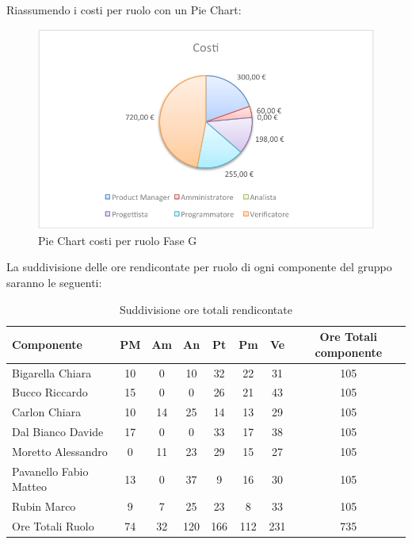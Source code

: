 				Riassumendo i costi per ruolo con un Pie Chart:
				\begin{figure}[H]\centering
					\includegraphics[width=\textwidth]{PianoDiProgetto/Pics/ChartTotCostiFaseG.pdf}
					\caption{Pie Chart costi per ruolo Fase G}
				\end{figure}
			La suddivisione delle ore rendicontate per ruolo di ogni componente del gruppo \groupname{} saranno le seguenti:
			\begin{table}[H]
				\begin{center}
					\begin{tabular}{| l | c | c | c | c | c | c | c |}
						\hline
						Componente 				& PM	& Am 	& An 	& Pt 		& Pm 	& Ve 	& Ore Totali componente \\ \hline
						
						Bigarella Chiara 			& 10 		& 0		& 10 		& 32 		& 22 		& 31 		& 105 \\
						Bucco Riccardo 			& 15 		& 0		& 0		& 26 		& 21		& 43 		& 105 \\
						Carlon Chiara	 			& 10 		& 14 		& 25 		& 14 		& 13 		& 29 		& 105 \\
						Dal Bianco Davide 			& 17 		& 0		& 0		& 33 		& 17 		& 38 		& 105 \\
						Moretto Alessandro 			& 0		& 11 		& 23 		& 29 		& 15 		& 27 		& 105 \\
						Pavanello Fabio Matteo	 	& 13 		& 0		& 37 		& 9 		& 16 		& 30 		& 105 \\
						Rubin Marco				& 9 		& 7 		& 25 		& 23 		& 8 		& 33		& 105 \\ \hline \hline
						
						Ore Totali Ruolo 			& 74 		& 32 		& 120 	& 166 	& 112 	& 231 	& 735\\ \hline
					\end{tabular}
				\end{center}
				\caption{Suddivisione ore totali rendicontate}
			\end{table}
